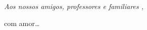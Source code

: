 \null
\vfill

{\normalsize \it \hfill Aos nossos amigos, professores e familiares , \vspace*{4pt}

\hfill com amor\dots}
